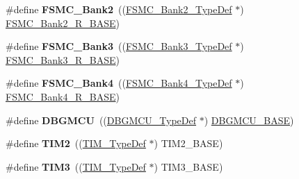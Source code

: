 \begin{DoxyCompactItemize}
\item 
\hypertarget{group___peripheral__declaration_gabb3dfb5e88694aa2983ecabd33a55e0a}{\#define {\bfseries F\-S\-M\-C\-\_\-\-Bank2}~((\hyperlink{struct_f_s_m_c___bank2___type_def}{F\-S\-M\-C\-\_\-\-Bank2\-\_\-\-Type\-Def} $\ast$) \hyperlink{group___peripheral__memory__map_ga3cb46d62f4f6458e186a5a4c753e4918}{F\-S\-M\-C\-\_\-\-Bank2\-\_\-\-R\-\_\-\-B\-A\-S\-E})}\label{group___peripheral__declaration_gabb3dfb5e88694aa2983ecabd33a55e0a}

\item 
\hypertarget{group___peripheral__declaration_ga411eedc00b5b2b22b494004d4f41b736}{\#define {\bfseries F\-S\-M\-C\-\_\-\-Bank3}~((\hyperlink{struct_f_s_m_c___bank3___type_def}{F\-S\-M\-C\-\_\-\-Bank3\-\_\-\-Type\-Def} $\ast$) \hyperlink{group___peripheral__memory__map_gacf056152c9e5aefcc67db78d1302c0d7}{F\-S\-M\-C\-\_\-\-Bank3\-\_\-\-R\-\_\-\-B\-A\-S\-E})}\label{group___peripheral__declaration_ga411eedc00b5b2b22b494004d4f41b736}

\item 
\hypertarget{group___peripheral__declaration_ga5aa00e4ac522693c6a21bc23ef5a96df}{\#define {\bfseries F\-S\-M\-C\-\_\-\-Bank4}~((\hyperlink{struct_f_s_m_c___bank4___type_def}{F\-S\-M\-C\-\_\-\-Bank4\-\_\-\-Type\-Def} $\ast$) \hyperlink{group___peripheral__memory__map_gaf9e5417133160b0bdd0498d982acec19}{F\-S\-M\-C\-\_\-\-Bank4\-\_\-\-R\-\_\-\-B\-A\-S\-E})}\label{group___peripheral__declaration_ga5aa00e4ac522693c6a21bc23ef5a96df}

\item 
\hypertarget{group___peripheral__declaration_ga92ec6d9ec2251fda7d4ce09748cd74b4}{\#define {\bfseries D\-B\-G\-M\-C\-U}~((\hyperlink{struct_d_b_g_m_c_u___type_def}{D\-B\-G\-M\-C\-U\-\_\-\-Type\-Def} $\ast$) \hyperlink{group___peripheral__memory__map_ga4adaf4fd82ccc3a538f1f27a70cdbbef}{D\-B\-G\-M\-C\-U\-\_\-\-B\-A\-S\-E})}\label{group___peripheral__declaration_ga92ec6d9ec2251fda7d4ce09748cd74b4}

\item 
\hypertarget{group___peripheral__declaration_ga3cfac9f2e43673f790f8668d48b4b92b}{\#define {\bfseries T\-I\-M2}~((\hyperlink{struct_t_i_m___type_def}{T\-I\-M\-\_\-\-Type\-Def} $\ast$) T\-I\-M2\-\_\-\-B\-A\-S\-E)}\label{group___peripheral__declaration_ga3cfac9f2e43673f790f8668d48b4b92b}

\item 
\hypertarget{group___peripheral__declaration_ga61ee4c391385607d7af432b63905fcc9}{\#define {\bfseries T\-I\-M3}~((\hyperlink{struct_t_i_m___type_def}{T\-I\-M\-\_\-\-Type\-Def} $\ast$) T\-I\-M3\-\_\-\-B\-A\-S\-E)}\label{group___peripheral__declaration_ga61ee4c391385607d7af432b63905fcc9}


\end{DoxyCompactItemize}
